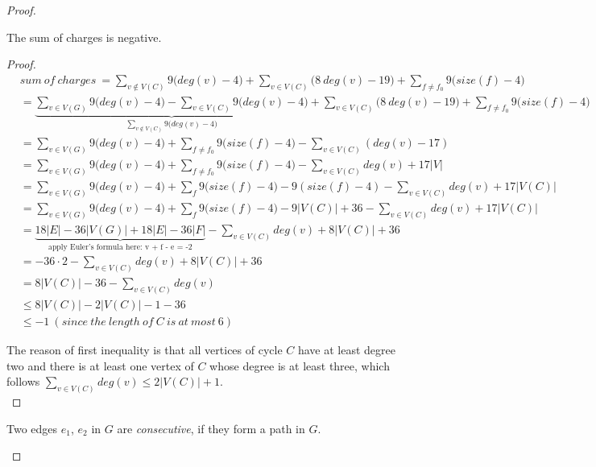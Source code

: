 \begin{proof}
\begin{claim}
The sum of charges is negative.
\end{claim}
\begin{proof}
\begin{align*}
    & sum \ of \ charges \ = \sum_{v \notin V(C)}9\big(deg(v) - 4\big) + \sum_{v \in V(C)} \big(8 \ deg(v) - 19\big) + \sum_{f \neq f_0}9\big(size(f) - 4\big) \\
    &= \underbrace{\sum_{v \in V(G)}9\big(deg(v) - 4\big) - \sum_{v \in V(C)}9\big(deg(v) - 4\big)}_{\sum_{v \notin V(C)}9\big(deg(v) - 4\big)} + \sum_{v \in V(C)} \big(8 \ deg(v) - 19\big) + \sum_{f \neq f_0}9\big(size(f) - 4\big) \\
    &= \sum_{v \in V(G)}9\big(deg(v) - 4\big) + \sum_{f \neq f_0}9\big(size(f) - 4\big) - \sum_{v \in V(C)}(deg(v) - 17)\\
    &= \sum_{v \in V(G)}9\big(deg(v) - 4\big) + \sum_{f \neq f_0}9\big(size(f) - 4\big) - \sum_{v \in V(C)}deg(v) + 17\left| V \right|\\
    &= \sum_{v \in V(G)}9\big(deg(v) - 4\big) + \sum_{f}9\big(size(f) - 4\big) - 9(size(f) - 4) - \sum_{v \in V(C)}deg(v) + 17\left| V(C) \right|\\
    &= \sum_{v \in V(G)}9\big(deg(v) - 4\big) + \sum_{f}9\big(size(f) - 4\big) - 9 \left| V(C) \right| + 36 - \sum_{v \in V(C)}deg(v) + 17\left| V(C) \right|\\
    &= \underbrace{18 \left| E \right| - 36\left| V(G) \right| + 18 \left| E \right| - 36 \left| F \right|}_{\text{apply Euler's formula here: v + f - e = -2}} - \sum_{v \in V(C)}deg(v) + 8 \left| V(C) \right| + 36 \\
    &= -36 \cdot 2 - \sum_{v \in V(C)}deg(v) + 8 \left| V(C) \right| + 36\\
    &= 8 \left| V(C) \right| - 36 - \sum_{v \in V(C)}deg(v)\\
    &\leq 8 \left| V(C) \right|- 2 \left| V(C) \right| - 1 - 36 \\
    &\leq -1 \ (since \ the \ length \ of \ C \ is \ at \ most \ 6)
\end{align*}

The reason of first inequality is that all vertices of cycle $C$ have at least degree two and there is at least one vertex of $C$ whose degree is at least three, which follows $\sum_{v \in V(C)}deg(v) \leq 2\left| V(C) \right| + 1$. \\
\end{proof}

\begin{definition}
Two edges $e_1$, $e_2$ in $G$ are \textit{consecutive}, if they form a path in $G$.
\end{definition}


\end{proof}
